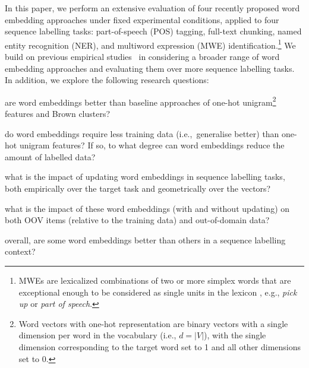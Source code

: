 


In this paper, we perform an extensive evaluation of four recently proposed word embedding
approaches under fixed experimental conditions, applied to four sequence
labelling tasks: part-of-speech (POS) tagging, full-text chunking, named entity
recognition (NER), and multiword expression (MWE) identification.\footnote{MWEs are lexicalized combinations of two or more
simplex words that are exceptional enough to be considered
as single units in the lexicon \cite{Baldwin:Kim:2009a,Schneider+:2014}, e.g.,
\textit{pick up} or \textit{part of speech}.}
We build on previous empirical
studies~\cite{collobert2011natural,turian2010word,pennington2014glove}
in considering a broader range of word embedding approaches 
and evaluating them over more sequence labelling tasks. In addition, we explore the following research questions:
\begin{compactenum}[\bf RQ1:]
\item are word embeddings better than baseline approaches of one-hot
  unigram\footnote{Word vectors with one-hot representation are binary
    vectors with a
    single dimension per word in the vocabulary (i.e., $d = |V|$), with
    the single dimension corresponding to the target word set to 1 and
    all other dimensions set to 0.} features and Brown clusters?
\item do word embeddings require less training data (i.e.,\ generalise
  better) than one-hot unigram features? If so, to what degree can word embeddings reduce the amount of labelled data?
\item what is the impact of updating word embeddings in sequence
  labelling tasks, both empirically over the target task and
  geometrically over the vectors?
\item what is the impact of these word embeddings (with and without
  updating) on both OOV items (relative to the training data) and
  out-of-domain data?
\item overall, are some word embeddings better than others in a sequence
  labelling context?
\end{compactenum}


